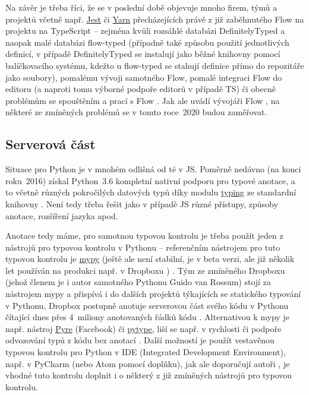 Na závěr je třeba říci, že se v poslední době objevuje mnoho firem, týmů a projektů včetně např. \href{https://jestjs.io/}{Jest} či \href{https://yarnpkg.com/}{Yarn} přecházejících právě z již zaběhnutého Flow na projektu na TypeScript -- zejména kvůli rozsáhlé databázi DefinitelyTyped a naopak malé databázi flow-typed (případně také způsobu použití jednotlivých definicí, v případě DefinitelyTyped se instalují jako běžné knihovny pomocí balíčkovacího systému, kdežto u flow-typed se stahují definice přímo do repozitáře jako soubory), pomalému vývoji samotného Flow, pomalé integraci Flow do editoru (a naproti tomu výborné podpoře editorů v případě TS) či obecně problémům se spouštěním a prací s Flow \cite{types-flow1, types-flow2, types-flow3}. Jak ale uvádí vývojáři Flow \cite{types-flow4}, na některé ze zmíněných problémů se v tomto roce~2020 budou zaměřovat.


\subsection{Serverová část}

Situace pro Python je v mnohém odlišná od té v JS. Poměrně nedávno (na konci roku~2016) získal Python~3.6 kompletní nativní podporu pro typové anotace, a to včetně různých pokročilých datových typů díky modulu \href{https://docs.python.org/3/library/typing.html}{typing} ze standardní knihovny \cite{types-python-bernat}. Není tedy třeba řešit jako v případě JS různé přístupy, způsoby anotace, rozšíření jazyka apod.

Anotace tedy máme, pro samotnou typovou kontrolu je třeba použít jeden z nástrojů pro typovou kontrolu v Pythonu -- referenčním nástrojem pro tuto typovou kontrolu je \href{http://mypy-lang.org/}{mypy} (ještě ale není stabilní, je v beta verzi, ale již několik let používán na produkci např. v Dropboxu \cite{mypy}) \cite{types-python-bernat}. Tým ze zmíněného Dropboxu (jehož členem je i autor samotného Pythonu Guido van Rossum) stojí za nástrojem mypy a přispívá i do dalších projektů týkajících se statického typování v Pythonu, Dropbox postupně anotuje serverovou část svého kódu v Pythonu čítající dnes přes 4~miliony anotovaných řádků kódu \cite{types-python-dropbox}. Alternativou k mypy je např. nástroj \href{https://github.com/facebook/pyre-check}{Pyre} (Facebook) či \href{https://github.com/google/pytype}{pytype}, liší se např. v rychlosti či podpoře odvozování typů z kódu bez anotací \cite{types-python-bernat, types-python-realpython}. Další možností je použít vestavěnou typovou kontrolu pro Python v IDE (Integrated Development Environment), např. v PyCharm (nebo Atom pomocí doplňku), jak ale doporučují autoři \cite{types-python-bernat, types-python-medium}, je vhodné tuto kontrolu doplnit i o některý z již zmíněných nástrojů pro typovou kontrolu.

